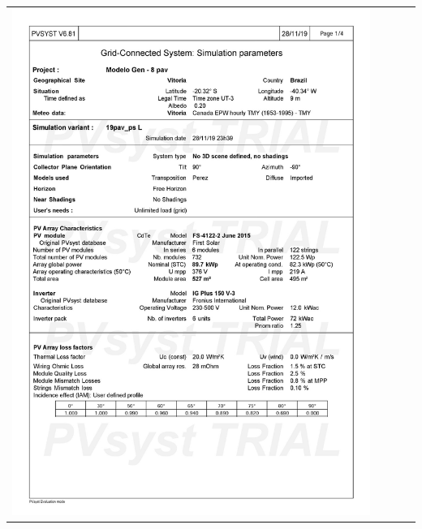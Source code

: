 \begin{table}[H]
    \centering
    \begin{tabular}{l}
        \includegraphics[width=0.9\textwidth]{figures/attachments/resultpv23.jpg}
    \end{tabular}
\end{table}
\pagebreak
